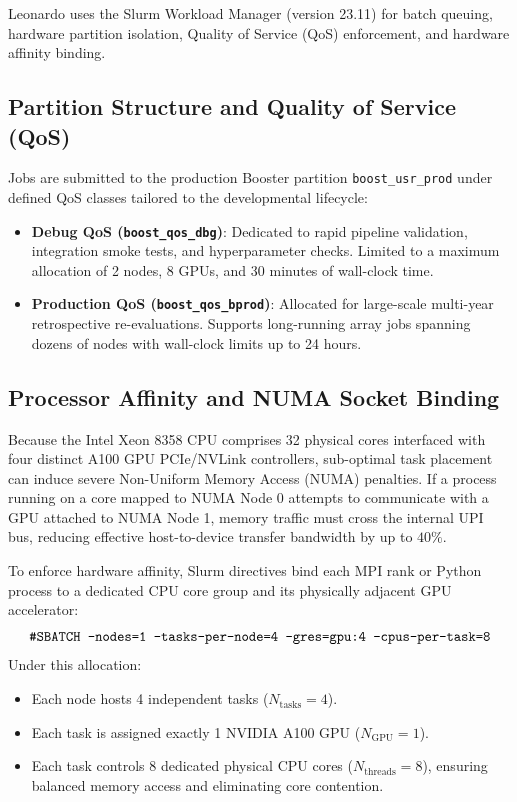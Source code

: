 Leonardo uses the Slurm Workload Manager (version 23.11) for batch queuing, hardware partition isolation, Quality of Service (\ac{QoS}) enforcement, and hardware affinity binding.

\subsection{Partition Structure and Quality of Service (QoS)}
Jobs are submitted to the production Booster partition \texttt{boost\_usr\_prod} under defined QoS classes tailored to the developmental lifecycle:
\begin{itemize}
  \item \textbf{Debug QoS (\texttt{boost\_qos\_dbg})}: Dedicated to rapid pipeline validation, integration smoke tests, and hyperparameter checks. Limited to a maximum allocation of 2 nodes, 8 GPUs, and 30 minutes of wall-clock time.
  \item \textbf{Production QoS (\texttt{boost\_qos\_bprod})}: Allocated for large-scale multi-year retrospective re-evaluations. Supports long-running array jobs spanning dozens of nodes with wall-clock limits up to 24 hours.
\end{itemize}

\subsection{Processor Affinity and NUMA Socket Binding}
Because the Intel Xeon 8358 CPU comprises 32 physical cores interfaced with four distinct A100 GPU PCIe/NVLink controllers, sub-optimal task placement can induce severe Non-Uniform Memory Access (\ac{NUMA}) penalties. If a process running on a core mapped to NUMA Node 0 attempts to communicate with a GPU attached to NUMA Node 1, memory traffic must cross the internal UPI bus, reducing effective host-to-device transfer bandwidth by up to $40\%$.

To enforce hardware affinity, Slurm directives bind each MPI rank or Python process to a dedicated CPU core group and its physically adjacent GPU accelerator:
\begin{equation}
  \text{\texttt{\#SBATCH --nodes=1 --tasks-per-node=4 --gres=gpu:4 --cpus-per-task=8}}
\end{equation}
Under this allocation:
\begin{itemize}
  \item Each node hosts 4 independent tasks ($N_{\mathrm{tasks}} = 4$).
  \item Each task is assigned exactly 1 NVIDIA A100 GPU ($N_{\mathrm{GPU}} = 1$).
  \item Each task controls 8 dedicated physical CPU cores ($N_{\mathrm{threads}} = 8$), ensuring balanced memory access and eliminating core contention.
\end{itemize}

